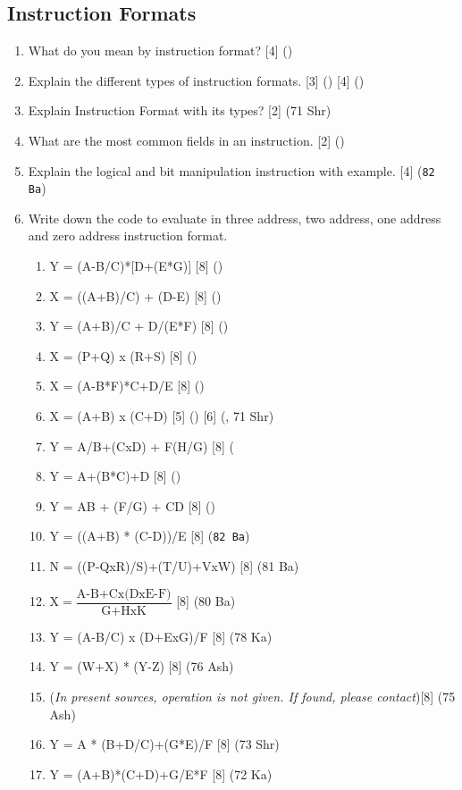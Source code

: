 \documentclass[12pt]{article}
\begin{document}
	\subsection{Instruction Formats}
	\begin{enumerate}
		\item What do you mean by instruction format? \hfill [4] ()
		
		\item Explain the different types of instruction formats. \hfill [3] () [4] ()
		
		\item Explain Instruction Format with its types? \hfill [2] (71 Shr)
		
		\item What are the most common fields in an instruction. \hfill [2] ()
		
		\item Explain the logical and bit manipulation instruction with example. \hfill [4] (\texttt{82 Ba})
		
		\item Write down the code to evaluate in three address, two address, one address and zero address instruction format.
		\begin{enumerate}[noitemsep, topsep = 0pt, label = \alph*.]
			\item Y = (A-B/C)*[D+(E*G)] \hfill [8] ()
			\item X = ((A+B)/C) + (D-E) \hfill [8] ()
			\item Y = (A+B)/C + D/(E*F) \hfill [8] ()
			\item X = (P+Q) x (R+S) \hfill [8] ()
			\item X = (A-B*F)*C+D/E \hfill [8] ()
			\item X = (A+B) x (C+D) \hfill [5] () [6] (, 71 Shr)
			\item Y = A/B+(CxD) + F(H/G) \hfill [8] (
			\item Y = A+(B*C)+D \hfill [8] ()
			\item Y = AB + (F/G) + CD \hfill [8] ()
			\item Y = ((A+B) * (C-D))/E \hfill [8] (\texttt{82 Ba})
			\item N = ((P-QxR)/S)+(T/U)+VxW) \hfill [8] (81 Ba)
			\item $\text{X} = \dfrac{\text{A-B+Cx(DxE-F})}{\text{G+HxK}}$ \hfill [8] (80 Ba)
			\item Y = (A-B/C) x (D+ExG)/F \hfill [8] (78 Ka)
			\item Y = (W+X) * (Y-Z) \hfill [8] (76 Ash)
			\item (\textit{In present sources, operation is not given. If found, please contact})\hfill [8] (75 Ash)
			\item Y = A * (B+D/C)+(G*E)/F \hfill [8] (73 Shr)
			\item Y = (A+B)*(C+D)+G/E*F \hfill [8] (72 Ka)
			
		\end{enumerate}
	\end{enumerate}
\end{document}

